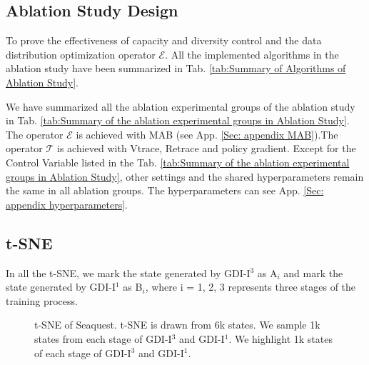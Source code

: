 \documentclass[nohyperref]{article}
\theoremstyle{plain}
\begin{document}
\subsection{Ablation Study Design}
\label{app: Ablation Study Design}

To prove the effectiveness of capacity and diversity control and the data distribution optimization operator $\mathcal{E}$. All the implemented algorithms in the ablation study have been summarized in Tab. \ref{tab:Summary of Algorithms of Ablation Study}. 


 We have summarized all the ablation experimental groups of the ablation study in Tab. \ref{tab:Summary of the ablation experimental groups in Ablation Study}. The operator $\mathcal{E}$ is achieved with MAB (see App. \ref{Sec: appendix MAB}).The operator $\mathcal{T}$ is achieved with Vtrace, Retrace and policy gradient. Except for the Control Variable listed in the Tab. \ref{tab:Summary of the ablation experimental groups in Ablation Study}, other settings and the shared hyperparameters remain the same in all ablation  groups. The hyperparameters can see App. \ref{Sec: appendix hyperparameters}.

\subsection{t-SNE}
\label{app: tsne}
In all the t-SNE, we mark the state generated by GDI-I$^3$ as A$_i$ and mark the state generated by GDI-I$^1$ as B$_i$, where i = 1, 2, 3 represents three stages of the training process.

\setcounter{subfigure}{0}
\begin{figure}[!ht]
	\begin{center}
	
	
	\end{center}
	\caption{t-SNE of Seaquest. 
t-SNE is drawn from 6k states.
	We sample 1k states from each stage of GDI-I$^3$ and GDI-I$^1$.
	We highlight 1k states of each stage of GDI-I$^3$ and GDI-I$^1$.}
	\label{Fig: t-SNE of Seaquest}
\end{figure}
\end{document}
